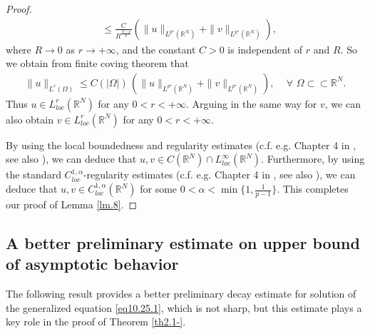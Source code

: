 \documentclass[12pt]{amsart}
\theoremstyle{definition}
\theoremstyle{remark}
\theoremstyle{conclusion}
\theoremstyle{conjecture}
\numberwithin{equation}{section}
\newcommand{\R}{\mathbb{R}}
\begin{document}
\begin{proof}
\begin{align}
&\leq \frac{C}{R^\frac{N-p}{p}} \left(\|u\|_{L^{p^{\star}}(\R^N)}+\|v\|_{L^{p^{\star}}(\R^N)}\right),\nonumber
\end{align}
where $R\rightarrow0$ as $r\rightarrow+\infty$, and the constant $C>0$ is independent of $r$ and $R$. So we obtain from finite coving theorem that
\begin{align}\label{eq10.28.10}
\|u\|_{L^r(\Omega)}
\leq C (|\Omega|) \,\left(\|u\|_{L^{p^{\star}}(\R^N)}+\|v\|_{L^{p^{\star}}(\R^N)}\right), \,\,\,\,\,\,\, \forall\,\, \Omega \subset\subset \R^N.
\end{align}
Thus $u\in L^{r}_{loc}(\mathbb{R}^{N})$ for any $0<r<+\infty$. Arguing in the same way for $v$, we can also obtain $v\in L^{r}_{loc}(\mathbb{R}^{N})$ for any $0<r<+\infty$.

By using the local boundedness and regularity estimates (c.f. e.g. Chapter 4 in \cite{HL}, see also \cite{ED83,KM,PT,XCL}), we can deduce that $u,v\in C(\R^N)\cap L_{loc}^\infty(\R^N)$. Furthermore, by using the standard $C_{loc}^{1,\alpha}$-regularity estimates (c.f. e.g. Chapter 4 in \cite{HL}, see also \cite{ED83,KM,PT,XCL}), we can deduce that $u,v\in C_{loc}^{1,\alpha}(\R^N)$ for some $0<\alpha<\min\{1,\frac{1}{p-1}\}$. This completes our proof of Lemma \ref{lm.8}.
\end{proof}


\subsection{A better preliminary estimate on upper bound of asymptotic behavior}\label{sc3.2}

The following result provides a better preliminary decay estimate for solution of the generalized equation \eqref{eq10.25.1}, which is not sharp, but this estimate plays a key role in the proof of Theorem \ref{th2.1-}.
\end{document}
